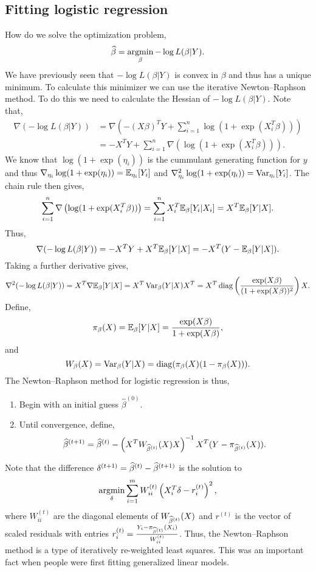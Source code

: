 \subsection{Fitting logistic regression}
How do we solve the optimization problem,
\[\widehat{\beta} = \operatorname*{argmin}_{\beta}-\log L(\beta|Y).  \]
We have previously seen that $-\log L(\beta|Y)$ is convex in $\beta$ and thus has a unique minimum. To calculate this minimizer we can use the iterative Newton--Raphson method. To do this we need to calculate the Hessian of $-\log L(\beta|Y)$. Note that,
\begin{align*}
    \nabla (-\log L(\beta|Y)) &=\nabla\left(-(X\beta)^TY+\sum_{i=1}^n \log(1+\exp(X_i^T\beta))\right)\\
    &=-X^TY+\sum_{i=1}^n \nabla\left(\log(1+\exp(X_i^T\beta))\right).
\end{align*}
We know that $\log(1+\exp(\eta_i))$ is the cummulant generating function for $y$ and thus $\nabla_{\eta_i}\log(1+\exp(\eta_i)) = {\mathbb{E}}_{\eta_i}[Y_i]$ and $\nabla_{\eta_i}^2 \log(1+\exp(\eta_i)) = \operatorname{Var}_{\eta_i}[Y_i]$. The chain rule then gives,
\[\sum_{i=1}^n \nabla\left(\log(1+\exp(X_i^T\beta))\right) = \sum_{i=1}^n X_i^T{\mathbb{E}}_{\beta}[Y_i|X_i] = X^T{\mathbb{E}}_\beta[Y|X]. \]
Thus,
\[ \nabla (-\log L(\beta|Y)) = -X^TY+X^T{\mathbb{E}}_\beta[Y|X]=-X^T(Y-{\mathbb{E}}_\beta[Y|X]). \]
Taking a further derivative gives,
\[\nabla^2(-\log L(\beta|Y)) = X^T\nabla {\mathbb{E}}_\beta[Y|X] = X^T \operatorname{Var}_{\beta}(Y|X)X^T = X^T \operatorname{diag}\left(\frac{\exp(X\beta)}{(1+\exp(X\beta))^2}\right)X. \]
Define,
\[\pi_\beta(X) = {\mathbb{E}}_\beta[Y|X] = \frac{\exp(X\beta)}{1+\exp(X\beta)},\]
and
\[W_\beta(X) = \operatorname{Var}_\beta(Y|X) = \operatorname{diag}(\pi_\beta(X)(1-\pi_\beta(X))). \]
The Newton--Raphson method for logistic regression is thus,
\begin{enumerate}
    \item Begin with an initial guess $\widehat{\beta}^{(0)}$.
    \item Until convergence, define, \[\widehat{\beta}^{(t+1)} = \widehat{\beta}^{(t)} - \left(X^T W_{\widehat{\beta}^{(t)}}(X) X\right)^{-1}X^T(Y-\pi_{\widehat{\beta}^{(t)}}(X)). \]
\end{enumerate}
Note that the difference $\delta^{(t+1)} = \widehat{\beta}^{(t)} - \widehat{\beta}^{(t+1)}$ is the solution to 
\[\operatorname*{argmin}_\delta \sum_{i=1}^m W_{ii}^{(t)}\left(X_i^T\delta - r_i^{(t)}\right)^2, \]
where $W_{ii}^{(t)}$ are the diagonal elements of $W_{\widehat{\beta}^{(t)}}(X)$ and $r^{(t)}$ is the vector of scaled residuals with entries $r_i^{(t)} = \frac{Y_i-\pi_{\widehat{\beta}^{(t)}}(X_i)}{W_{ii}^{(t)}}$. Thus, the Newton--Raphson method is a type of iteratively re-weighted least squares. This was an important fact when people were first fitting generalized linear models.

